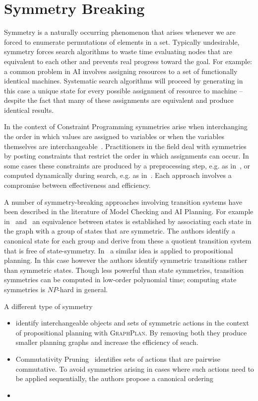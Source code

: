 \section{Symmetry Breaking}
\label{cha::lit::symmetry}
Symmetry is a naturally occurring phenomenon that arises whenever we are forced
to enumerate permutations of elements in a set. Typically
undesirable, symmetry forces search algorithms to waste time evaluating nodes that
are equivalent to each other and prevents real progress toward the goal.
For example: a common problem in AI involves assigning resources to a set of 
functionally identical machines. Systematic search algorithms will proceed by 
generating in this case a unique state for every possible assignment of resource
to machine -- despite the fact that many of these assignments are equivalent and
produce identical results.

In the context of Constraint Programming symmetries arise when interchanging
the order in which values are assigned to variables or when the variables themselves
are interchangeable~\citep{walsh07}. Practitioners in the field deal with symmetries
by posting constraints that restrict the order in which assignments can occur.
In some cases these constraints are produced by a preprocessing step,
 e.g. as in~\citep{crawford96}, or computed dynamically during search,
 e.g. as in~\cite{roney-dougal04}. Each approach involves a compromise between 
effectiveness and efficiency.

A number of symmetry-breaking approaches involving transition systems have been described in the
literature of Model Checking and AI Planning. For example in~\cite{emerson96} and~\cite{pochter11}
an equivalence between states is established by associating each state in the graph with a group of
states that are symmetric. The authors identify a canonical state for each group and derive from
these a quotient transition system that is free of state-symmetry. In~\citep{rintannen03} a similar
idea is applied to propositional planning. In this case however the authors identify symmetric
transitions rather than symmetric states.  Though less powerful than state symmetries, transition
symmetries can be computed in low-order polynomial time; computing state symmetries is $NP$-hard in
general.

A different type of symmetry

\begin{itemize}
\item \cite{fox99} identify interchangeable objects and sets of symmetric actions
in the context of propositional planning with \textsc{GraphPlan}. By removing both
they produce smaller planning graphs and increase the efficiency of seach.
\item Commutativity Pruning~\cite{haslum00} identifies sets of actions that are 
pairwise commutative. To avoid symmetries arising in cases where such actions
need to be applied sequentially, the authors propose a canonical ordering 
\item  

\end{itemize}

